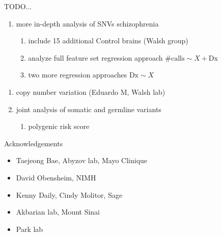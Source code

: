\documentclass{beamer}
\begin{document}
\begin{frame}{TODO...}
\begin{enumerate}
\item more in-depth analysis of SNVs schizophrenia
\begin{enumerate}
\item include 15 additional Control brains (Walsh group)
\item analyze full feature set regression approach \(\mathrm{\#calls} \sim X + \mathrm{Dx}\)
\item two more regression approaches \(\mathrm{Dx} \sim X\)
\end{enumerate}
\end{enumerate}
\begin{enumerate}
\item copy number variation (Eduardo M, Walsh lab)
\item joint analysis of somatic and germline variants
\begin{enumerate}
\item polygenic risk score
\end{enumerate}
\end{enumerate}
\end{frame}

\begin{frame}{Acknowledgements}
\begin{itemize}
\item Taejeong Bae, Abyzov lab, Mayo Clinique
\item David Obensheim, NIMH
\item Kenny Daily, Cindy Molitor, Sage
\item Akbarian lab, Mount Sinai
\item Park lab
\end{itemize}
\end{frame}
\end{document}
